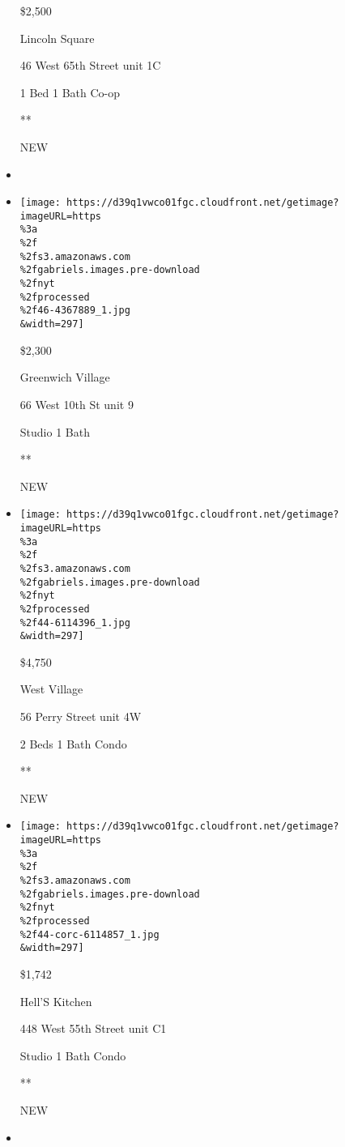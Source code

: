 \begin{itemize}
  \$2,500

  Lincoln Square

  46 West 65th Street unit 1C

  1 Bed \textbar{} 1 Bath \textbar{} Co-op

  **

  NEW
\item
\item
  \href{/real-estate/usa/ny/new-york/greenwich-village/homes-for-rent/66-west-10th-st/46-4367889?}{}

  \texttt{[image: https://d39q1vwco01fgc.cloudfront.net/getimage?imageURL=https\\\%3a\\\%2f\\\%2fs3.amazonaws.com\\\%2fgabriels.images.pre-download\\\%2fnyt\\\%2fprocessed\\\%2f46-4367889\_1.jpg\\\&width=297]}

  \$2,300

  Greenwich Village

  66 West 10th St unit 9

  Studio \textbar{} 1 Bath \textbar{}

  **

  NEW
\item
  \href{/real-estate/usa/ny/new-york/west-village/homes-for-rent/56-perry-street/44-6114396?}{}

  \texttt{[image: https://d39q1vwco01fgc.cloudfront.net/getimage?imageURL=https\\\%3a\\\%2f\\\%2fs3.amazonaws.com\\\%2fgabriels.images.pre-download\\\%2fnyt\\\%2fprocessed\\\%2f44-6114396\_1.jpg\\\&width=297]}

  \$4,750

  West Village

  56 Perry Street unit 4W

  2 Beds \textbar{} 1 Bath \textbar{} Condo

  **

  NEW
\item
  \href{/real-estate/usa/ny/new-york/hells-kitchen/homes-for-rent/448-west-55th-street/44-CORC-6114857?}{}

  \texttt{[image: https://d39q1vwco01fgc.cloudfront.net/getimage?imageURL=https\\\%3a\\\%2f\\\%2fs3.amazonaws.com\\\%2fgabriels.images.pre-download\\\%2fnyt\\\%2fprocessed\\\%2f44-corc-6114857\_1.jpg\\\&width=297]}

  \$1,742

  Hell'S Kitchen

  448 West 55th Street unit C1

  Studio \textbar{} 1 Bath \textbar{} Condo

  **

  NEW
\item
  \href{/real-estate/usa/ny/brooklyn/bushwick/homes-for-rent/1384-madison-street/44-6117290?}{}


\end{itemize}
